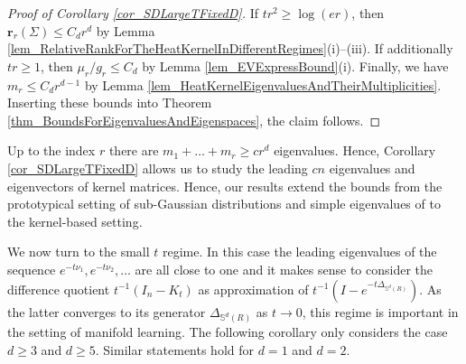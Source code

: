 \documentclass[a4paper,11pt]{article} %
\numberwithin{equation}{section}
\theoremstyle{definition}
\theoremstyle{remark}
\theoremstyle{plain}
\begin{document}
\begin{proof}[Proof of Corollary \ref{cor_SDLargeTFixedD}]
    If $t r^2 \ge \log(er)$, then $\mathbf{r}_r(\Sigma)\leq C_dr^d$ by Lemma \ref{lem_RelativeRankForTheHeatKernelInDifferentRegimes}(i)--(iii). If additionally $tr\geq 1$, then $\mu_r/g_r\leq C_d$ by Lemma \ref{lem_EVExpressBound}(i). Finally, we have $m_r\leq C_dr^{d-1}$ by Lemma \ref{lem_HeatKernelEigenvaluesAndTheirMultiplicities}. Inserting these bounds into Theorem \ref{thm_BoundsForEigenvaluesAndEigenspaces}, the claim follows.
\end{proof}

Up to the index $r$ there are $m_1+\dots+m_r\geq cr^d$ eigenvalues. Hence, Corollary \ref{cor_SDLargeTFixedD} allows us to study the leading $cn$ eigenvalues and eigenvectors of kernel matrices. Hence, our results extend the bounds from the prototypical setting of sub-Gaussian distributions and simple eigenvalues of \cite{Wahl2026PertubationExpansionsI} to the kernel-based setting.

We now turn to the small $t$ regime. In this case the leading eigenvalues of the sequence $e^{-t\nu_1},e^{-t\nu_2},\dots$ are all close to one and it makes sense to consider the difference quotient $t^{-1}(I_n-K_t)$ as approximation of $t^{-1}(I-e^{-t\Delta_{\mathbb{S}^{d}(R)}})$. As the latter converges to its generator $\Delta_{\mathbb{S}^{d}(R)}$ as $t\rightarrow 0$, this regime is important in the setting of manifold learning. The following corollary only considers the case $d\geq 3$ and $d\geq 5$. Similar statements hold for $d=1$ and $d=2$.
\end{document}
